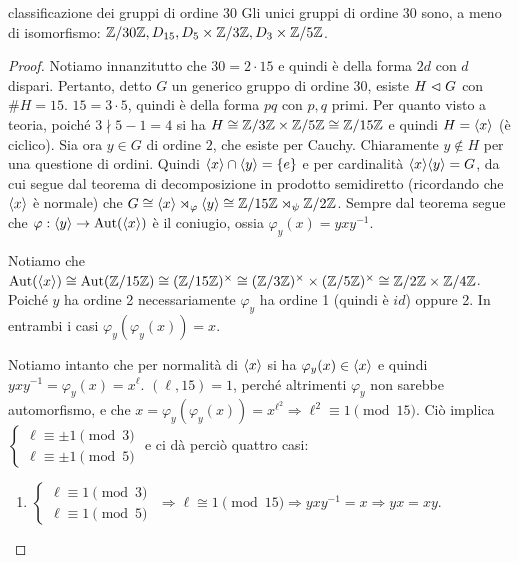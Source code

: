 \begin{example2}{classificazione dei gruppi di ordine 30}
    Gli unici gruppi di ordine $30$ sono, a meno di isomorfismo: $\mathbb{Z}/30\mathbb{Z}, D_{15}, D_5 \times \mathbb{Z}/3\mathbb{Z},  D_3 \times \mathbb{Z}/5\mathbb{Z}$.
\end{example2}
\begin{proof}
    Notiamo innanzitutto che $30 = 2\cdot15$ e quindi è della forma $2d$ con $d$ dispari. Pertanto, detto $G$ un generico gruppo di ordine 30, esiste $H \vartriangleleft G$ con $\#H = 15$. $15 = 3 \cdot 5$, quindi è della forma $pq$ con $p,q$ primi. Per quanto visto a teoria, poiché $3 \nmid 5-1 = 4$ si ha $H \cong \mathbb{Z}/3\mathbb{Z} \times \mathbb{Z}/5\mathbb{Z} \cong\mathbb{Z}/15\mathbb{Z}$ e quindi $H = \langle x \rangle$ (è ciclico). Sia ora $y \in G$ di ordine $2$, che esiste per Cauchy. Chiaramente $y \not \in H$ per una questione di ordini. Quindi $\langle x \rangle\cap\langle y \rangle = \left\{ e \right\}$ e per cardinalità $\langle x \rangle\langle y \rangle = G$, da cui segue dal teorema di decomposizione in prodotto semidiretto (ricordando che $\langle x \rangle$ è normale) che $G \cong \langle x \rangle \rtimes_{\varphi} \langle y \rangle \cong  \mathbb{Z}/15\mathbb{Z} \rtimes_{\psi} \mathbb{Z} /2\mathbb{Z}$. Sempre dal teorema segue che  $\varphi: \langle y \rangle \rightarrow \text{Aut}(\langle x \rangle)$ è il coniugio, ossia $\varphi_y(x) = yxy^{-1}$.
    
    Notiamo che $\text{Aut}(\langle x \rangle) \cong \text{Aut}(\mathbb{Z}/15\mathbb{Z}) \cong (\mathbb{Z}/15\mathbb{Z})^\times \cong (\mathbb{Z}/3\mathbb{Z})^\times \times (\mathbb{Z}/5\mathbb{Z})^\times \cong \mathbb{Z}/2\mathbb{Z} \times \mathbb{Z}/4\mathbb{Z}$. Poiché $y$ ha ordine 2 necessariamente $\varphi_y$ ha ordine 1 (quindi è $id$) oppure 2. In entrambi i casi $\varphi_y(\varphi_y(x)) = x$.
    
    Notiamo intanto che per normalità di $\langle x \rangle$ si ha $\varphi_y(x) \in \langle x \rangle$ e quindi $yxy^{-1} = \varphi_y(x) = x^{\ell}$.
    $(\ell,15) = 1$, perché altrimenti $\varphi_y$ non sarebbe automorfismo, e che $x = \varphi_y(\varphi_y(x)) = x^{\ell^2} \Rightarrow \ell^2 \equiv 1 \pmod{15}$. Ciò implica
    $\begin{cases}
    \ell \equiv \pm 1 \pmod{3} \\
    \ell \equiv \pm 1 \pmod{5} 
    \end{cases}$
    e ci dà perciò quattro casi: 
    \begin{enumerate}
        \item
        $\begin{cases}
        \ell \equiv  1 \pmod{3} \\
        \ell \equiv  1 \pmod{5} 
        \end{cases}$ $\Rightarrow \ell \cong 1 \pmod{15} \Rightarrow yxy^{-1} = x \Rightarrow yx = xy$.
        

\end{enumerate}
\end{proof}
